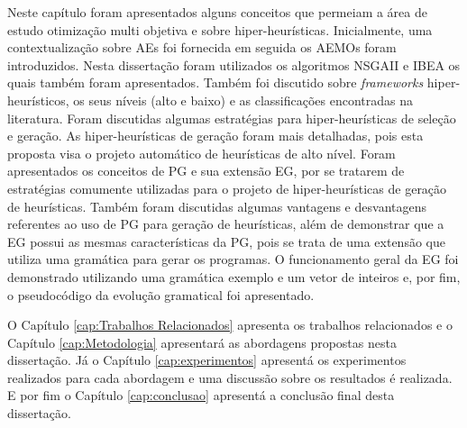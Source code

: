 Neste capítulo foram apresentados alguns conceitos que permeiam a área de estudo otimização multi objetiva e sobre hiper-heurísticas. Inicialmente, uma contextualização sobre AEs foi fornecida em seguida os AEMOs foram introduzidos. Nesta dissertação foram utilizados os algoritmos NSGAII e IBEA os quais também foram apresentados. Também foi discutido sobre \textit{frameworks} hiper-heurísticos,  os seus níveis (alto e baixo) e as classificações encontradas na literatura.  Foram discutidas algumas estratégias para hiper-heurísticas de seleção e geração. As hiper-heurísticas de geração foram mais detalhadas, pois esta proposta visa o projeto  automático de heurísticas de alto nível. Foram apresentados os conceitos de PG e sua extensão EG, por se tratarem de estratégias comumente utilizadas para o projeto de hiper-heurísticas de geração de heurísticas. Também foram discutidas algumas vantagens e desvantagens referentes ao uso de PG para geração de heurísticas, além de demonstrar que a EG possui as mesmas características da PG, pois se trata de uma extensão que utiliza uma gramática para gerar os programas. O funcionamento geral da EG foi demonstrado utilizando uma gramática exemplo e um vetor de inteiros e, por fim, o pseudocódigo da evolução gramatical foi apresentado. 

O Capítulo \ref{cap:Trabalhos Relacionados} apresenta os trabalhos relacionados e o Capítulo \ref{cap:Metodologia} apresentará as abordagens propostas nesta dissertação. Já o Capítulo \ref{cap:experimentos} apresentá os experimentos realizados para cada abordagem e uma discussão sobre os resultados é realizada. E por fim o Capítulo \ref{cap:conclusao} apresentá a conclusão final desta dissertação.



